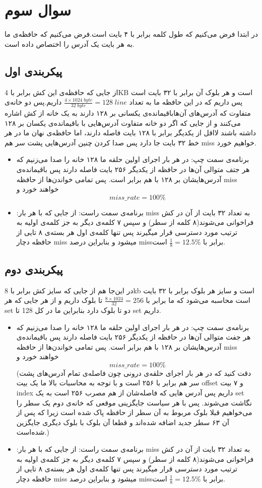 \documentclass[11pt]{article}
\begin{document}
\section{سوال سوم}
در ابتدا فرض می‌کنیم که طول کلمه برابر با ۴ بایت است.فرض می‌کنیم که حافظه‌ی ما به هر بایت یک آدرس را اختصاص داده است.
\subsection{پیکربندی‌ اول}
از جایی که حافظه‌‌ی این کش برابر با 4KB است و هر بلوک آن برابر با ۳۲ بایت است پس داریم که در این حافظه ما به تعداد
$\frac{4\times 1024\;byte}{32\;byte} = 128\;line$
داریم.پس دو خانه‌ی متفاوت که آدرس‌های آن‌هاباقیمانده‌ی یکسانی بر ۱۲۸ دارند به یک خانه از کش اشاره می‌کنند و از جایی که اگر دو خانه متفاوت آدرس‌هایی با باقیمانده‌ی یکسان بر ۱۲۸ داشته باشند لااقل از یکدیگر برابر با ۱‍۲۸ بایت فاصله دارند، اما حافظه‌ی نهان ما در هر خط ۳۲ بایت جا دارد پس صدا کردن چنین آدرس‌هایی پشت سر هم miss خواهیم خورد.
\begin{itemize}
\item برنامه‌ی سمت چپ:
در هر بار اجرای اولین حلقه ما ۱۲۸ خانه را صدا می‌زنیم که هر جتف متوالی آن‌ها در حافظه از یکدیگر ۲۵۶ بایت فاصله دارند پس باقیمانده‌ی آدرس‌هایشان بر ۱۲۸ با هم برابر است. پس تمامی خواندن‌ها از حافظه miss خواهند خورد و
$$miss\_rate = 100\%$$
\item:برنامه‌ی سمت راست:
از جایی که با هر بار miss به تعداد ۳۲ بایت از آن در کش فراخوانی می‌شوند(۸ کلمه از سطر) و سپس ۷ کلمه‌ی دیگر به جز کلمه‌ی اولیه به ترتیب مورد دسترسی قرار میگیرند پس تنها کلمه‌ی اول هر بسته‌ی ۸ تایی از حافظه دچار miss میشود و بنابراین درصد missبرابر با
 $\frac{1}{8} = 12.5\%$
 است.
\end{itemize} 

\subsection{پیکر‌بندی‌ دوم}
در این‌جا هم از جایی که سایز کش برابر با 8kb است  و سایز هر بلوک برابر با ۳۲ بایت است محاسبه می‌شود که ما برابر با
 $\frac{8 \times 1024}{32} = 256$
 تا بلوک داریم و از هر جایی که هر set دو تا بلوک دارد بنابراین ما در کل 128 تا set داریم. 
 \begin{itemize}
\item برنامه‌ی سمت چپ:
در هر بار اجرای اولین حلقه ما ۱۲۸ خانه را صدا می‌زنیم که هر جفت متوالی آن‌ها در حافظه از یکدیگر ۲۵۶ بایت فاصله دارند پس باقیمانده‌ی آدرس‌هایشان بر ۱۲۸ با هم برابر است. پس تمامی خواندن‌ها از حافظه miss خواهند خورد و
$$miss\_rate = 100\%$$
(دقت کنید که در هر بار اجرای حلقه‌ی درونی چون فاصله‌ی تمام آدرس‌های پشت سر هم برابر با ۲۵۶ است و با توجه به محاسبات بالا ما یک بیت offset و ۷ بیت index داریم پس آدرس ‌هایی که فاصله‌شان از هم مصرب ۲۵۶ است به یک set نگاشت می‌شوند. پس با هر سیاست جایگزینی موقعی که خانه‌ی دوم یک سطر را می‌خواهیم قبلا بلوک مربوط به آن سطر از حافظه پاک شده است زیرا که پس از آن ۶۳ سطر جدید اضافه شده‌اند و قطعا آن بلوک با بلوک دیگری جایگزین شده‌است.)
\item:برنامه‌ی سمت راست:
از جایی که با هر بار miss به تعداد ۳۲ بایت از آن در کش فراخوانی می‌شوند(۸ کلمه از سطر) و سپس ۷ کلمه‌ی دیگر به جز کلمه‌ی اولیه به ترتیب مورد دسترسی قرار میگیرند پس تنها کلمه‌ی اول هر بسته‌ی ۸ تایی از حافظه دچار miss میشود و بنابراین درصد missبرابر با
 $\frac{1}{8} = 12.5\%$
 است.
\end{itemize} 
\end{document}
